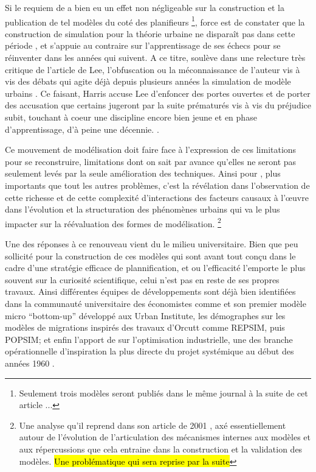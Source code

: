 Si le requiem de \textcite{Lee1973} a bien eu un effet non négligeable sur la construction et la publication de tel modèles du coté des planifieurs \footnote{Seulement trois modèles seront publiés dans le même journal à la suite de cet article ...}, force est de constater que la construction de simulation pour la théorie urbaine ne disparaît pas dans cette période \autocite[11-12]{Batty1994}, et s'appuie au contraire sur l'apprentissage de ses échecs pour se réinventer dans les années qui suivent. A ce titre, \textcite{Harris1994} soulève dans une relecture très critique de l'article de Lee, l'obfuscation ou la méconnaissance de l'auteur vis à vis des débats qui agite déjà depuis plusieurs années la simulation de modèle urbains \autocite{Wilson1970, Orcutt1957, Harris1968}. Ce faisant, Harris accuse Lee d'enfoncer des portes ouvertes et de porter des accusation que certains jugeront par la suite prématurés vis à vis du préjudice subit, touchant à coeur une discipline encore bien jeune et en phase d'apprentissage, d'à peine une décennie. \autocite[p11]{Batty1994}.

Ce mouvement de modélisation doit faire face à l'expression de ces limitations pour se reconstruire, limitations dont on sait par avance qu'elles ne seront pas seulement levés par la seule amélioration des techniques. Ainsi pour \autocite[11]{Batty1976}, plus importants que tout les autres problèmes, c'est la révélation dans l'observation de cette richesse et de cette complexité d'interactions des facteurs causaux à l’œuvre dans l'évolution et la structuration des phénomènes urbains qui va le plus impacter sur la réévaluation des formes de modélisation. \footnote{Une analyse qu'il reprend dans son article de 2001 \autocite{Batty2001}, axé essentiellement autour de l'évolution de l'articulation des mécanismes internes aux modèles et aux répercussions que cela entraine dans la construction et la validation des modèles. \hl{Une problématique qui sera reprise par la suite}}

Une des réponses à ce renouveau vient du le milieu universitaire. Bien que peu sollicité \autocite[9]{Batty1994} pour la construction de ces modèles qui sont avant tout conçu dans le cadre d'une stratégie efficace de plannification, et ou l'efficacité l'emporte le plus souvent sur la curiosité scientifique, celui n'est pas en reste de ses propres travaux. Ainsi différentes équipes de développements sont déjà bien identifiées dans la communauté universitaire des économistes comme \textcite{Orcutt1960} et son premier modèle micro \foreignquote{english}{bottom-up} développé aux Urban Institute, les démographes sur les modèles de migrations inspirés des travaux d'Orcutt comme REPSIM, puis POPSIM; et enfin l'apport de \textcite{Forrester1961} sur l'optimisation industrielle, une des branche opérationnelle d'inspiration la plus directe du projet systémique au début des années 1960 \autocite{Cohen1961} \autocite[911]{Shubik1960b}.

